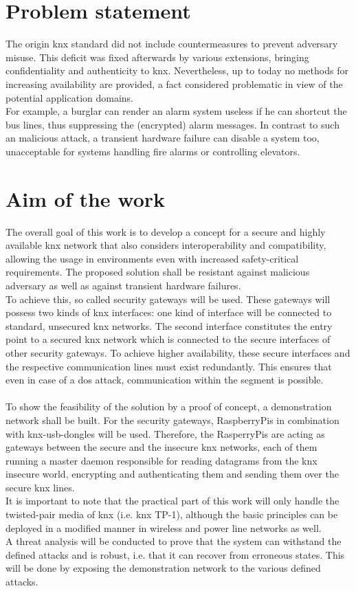\section{Problem statement}
The origin \gls{knx} standard did not include countermeasures to prevent adversary misuse. This deficit was fixed afterwards by various extensions, bringing confidentiality and
authenticity to \gls{knx}. Nevertheless, up to today no methods for increasing availability are provided, a fact considered problematic in view of the potential application domains.
\\
For example, a burglar can render an alarm system useless if he can shortcut the bus lines, thus suppressing the (encrypted) alarm messages. In contrast to such an malicious attack, a transient
hardware failure can disable a system too, unacceptable for systems handling fire alarms or controlling elevators.

\section{Aim of the work}

The overall goal of this work is to develop a concept for a secure and highly available \gls{knx} network that also considers interoperability and compatibility, 
allowing the usage in environments even with increased safety-critical requirements. The proposed solution shall be resistant against malicious adversary as well as against
transient hardware failures.
\\
To achieve this, so called security gateways will be used. These gateways will possess two kinds of \gls{knx} interfaces: one kind of interface will be
connected to standard, unsecured \gls{knx} networks.
The second interface constitutes the entry point to a secured \gls{knx} network which is connected to the secure interfaces of other
security gateways. To achieve higher availability, these secure interfaces and the respective communication lines must exist redundantly. This ensures that
even in case of a \gls{dos} attack, communication within the segment is possible.
\\
\\
To show the feasibility of the solution by a proof of concept, a demonstration network shall be built.
For the security gateways, RaspberryPis in combination with \gls{knx}-\gls{usb}-dongles will be used. Therefore, the RasperryPis
are acting as gateways between the secure and the insecure \gls{knx} networks, each of them running a master daemon responsible
for reading datagrams from the \gls{knx} insecure world, encrypting and authenticating them and sending them over the secure
\gls{knx} lines.
\\
It is important to note that the practical part of this work will only
handle the twisted-pair media of \gls{knx} (i.e. \gls{knx} \gls{TP}-1), although the basic principles can be deployed in a modified manner in
wireless and power line networks as well.
\\
A threat analysis will be conducted to prove that the system can withstand the defined attacks and is robust,
i.e. that it can recover from erroneous states. This will be done by exposing the demonstration network to the various defined attacks. 

